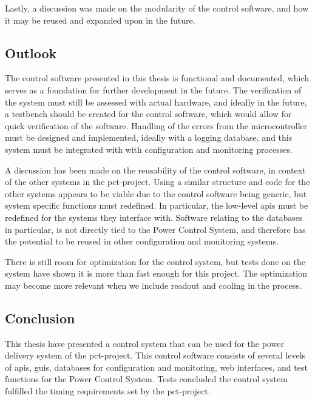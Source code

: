 \documentclass[main.tex]{subfiles}
\begin{document}
Lastly, a discussion was made on the modularity of the control software, and how it may be reused and expanded upon in the future.

\subsection{Outlook}
The control software presented in this thesis is functional and documented, which serves as a foundation for further development in the future. The verification of the system must still be assessed with actual hardware, and ideally in the future, a testbench should be created for the control software, which would allow for quick verification of the software. Handling of the errors from the microcontroller must be designed and implemented, ideally with a logging database, and this system must be integrated with with configuration and monitoring processes.

A discussion has been made on the reusability of the control software, in context of the other systems in the \gls{pct}-project. Using a similar structure and code for the other systems appears to be viable due to the control software being generic, but system specific functions must redefined. In particular, the low-level \gls{api}s must be redefined for the systems they interface with. Software relating to the databases in particular, is not directly tied to the Power Control System, and therefore has the potential to be reused in other configuration and monitoring systems.

There is still room for optimization for the control system, but tests done on the system have shown it is more than fast enough for this project. The optimization may become more relevant when we include readout and cooling in the process.

\subsection{Conclusion}

This thesis have presented a control system that can be used for the power delivery system of the \gls{pct}-project. This control software consists of several levels of \gls{api}s, \gls{gui}s, databases for configuration and monitoring, web interfaces, and test functions for the Power Control System. Tests concluded the control system fulfilled the timing requirements set by the \gls{pct}-project.
\end{document}
